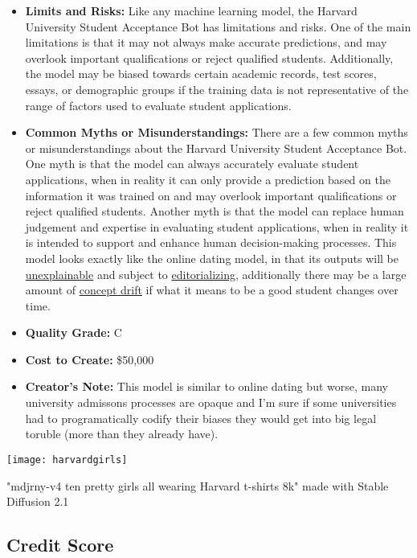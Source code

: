 \begin{itemize}
\begin{itemize}
\begin{enumerate}
        \end{enumerate}
    \item \textbf{Limits and Risks:} Like any machine learning model, the Harvard University Student Acceptance Bot has limitations and risks. One of the main limitations is that it may not always make accurate predictions, and may overlook important qualifications or reject qualified students. Additionally, the model may be biased towards certain academic records, test scores, essays, or demographic groups if the training data is not representative of the range of factors used to evaluate student applications.
    \item \textbf{Common Myths or Misunderstandings:} There are a few common myths or misunderstandings about the Harvard University Student Acceptance Bot. One myth is that the model can always accurately evaluate student applications, when in reality it can only provide a prediction based on the information it was trained on and may overlook important qualifications or reject qualified students. Another myth is that the model can replace human judgement and expertise in evaluating student applications, when in reality it is intended to support and enhance human decision-making processes. This model looks exactly like the online dating model, in that its outputs will be \hyperref[sec:explain]{unexplainable} and subject to \hyperref[sec:janitor]{editorializing}, additionally there may be a large amount of \hyperref[sec:drift]{concept drift} if what it means to be a good student changes over time. 
    \item \textbf{Quality Grade:} C
    \item \textbf{Cost to Create:} \$50,000
    \item \textbf{Creator's Note:} This model is similar to online dating but worse, many university admissons processes are opaque and I'm sure if some universities had to programatically codify their biases they would get into big legal toruble (more than they already have).
\end{itemize}

\begin{marginfigure}[-5.5cm]
        \texttt{[image: harvardgirls]}
        \caption{"mdjrny-v4 ten pretty girls all wearing Harvard t-shirts 8k" made with Stable Diffusion 2.1}
\end{marginfigure}

\subsection{Credit Score}


\end{itemize}
